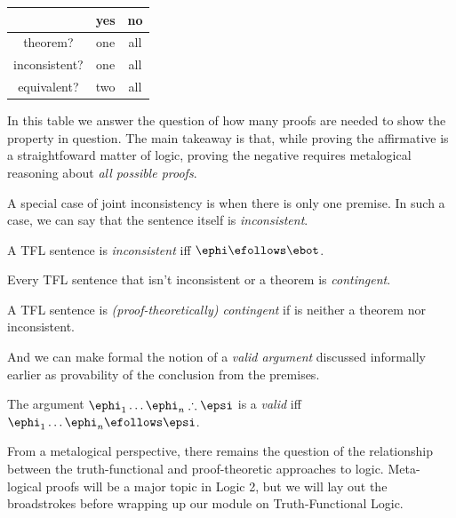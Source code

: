 \begin{center}
  \begin{tabular}{c c c}
                  & \textbf{yes} & \textbf{no} \\
    \hline
    theorem?      & one          & all         \\
    inconsistent? & one          & all         \\
    equivalent?   & two          & all         \\
  \end{tabular}
\end{center}

In this table we answer the question of how many proofs are needed to show the
property in question. The main takeaway is that, while proving the affirmative
is a straightfoward matter of logic, proving the negative requires metalogical
reasoning about \emph{all possible proofs}.

A special case of joint inconsistency is when there is only one premise. In
such a case, we can say that the sentence itself is \emph{inconsistent}.

\begin{definition}
  \label{def:consistent-sentence}
  A TFL sentence \ephi is \emph{inconsistent} iff $\ephi\efollows\ebot$.
\end{definition}

Every TFL sentence that isn't inconsistent or a theorem is \emph{contingent}.

\begin{definition}
  \label{def:contingent-sentence}
  A TFL sentence \ephi is \emph{(proof-theoretically) contingent} if \ephi is
  neither a theorem nor inconsistent.
\end{definition}

And we can make formal the notion of a \emph{valid argument} discussed
informally earlier as provability of the conclusion from the premises.

\begin{definition}
  \label{def:joint-consistency}
  The argument $\ephi_1\dots\ephi_n\therefore\epsi$ is a \emph{valid} iff
  $\ephi_1\dots\ephi_n\efollows\epsi$.
\end{definition}

From a metalogical perspective, there remains the question of the relationship
between the truth-functional and proof-theoretic approaches to logic. Meta-
logical proofs will be a major topic in Logic 2, but we will lay out the
broadstrokes before wrapping up our module on Truth-Functional Logic.

